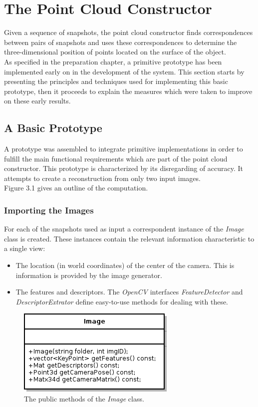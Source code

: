 \documentclass[12pt,a4paper,twoside,openright]{report}
\begin{document}
\section{The Point Cloud Constructor}
Given a sequence of snapshots, the point cloud constructor finds correspondences between pairs of snapshots and uses these correspondences to determine the three-dimensional position of points located on the surface of the object. \\
\linebreak
As specified in the preparation chapter, a primitive prototype has been implemented early on in the development of the system. This section starts by presenting the principles and techniques used for implementing this basic prototype, then it proceeds to explain the measures which were taken to improve on these early results.

\subsection{A Basic Prototype}
A prototype was assembled to integrate primitive implementations in order to fulfill the main functional requirements which are part of the point cloud constructor. This prototype is characterized by its disregarding of accuracy. It attempts to create a reconstruction from only two input images. \\
Figure 3.1 gives an outline of the computation.

\subsubsection{Importing the Images}
For each of the snapshots used as input a correspondent instance of the \emph{Image} class is created. These instances contain the relevant information characteristic to a single view:
\begin{itemize}
\item The location (in world coordinates) of the center of the camera. This is information is provided by the image generator.
\item The features and descriptors. The \emph{OpenCV} interfaces \emph{FeatureDetector} and \emph{DescriptorExtrator} define easy-to-use methods for dealing with these.
\end{itemize}

\begin{figure}
\centerline{\includegraphics[scale=0.6]{figs/image.png}}
\caption{The public methods of the \emph{Image} class.}
\end{figure}
\end{document}

